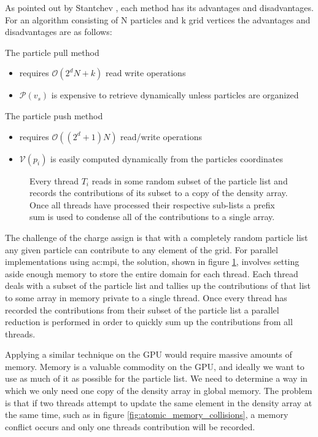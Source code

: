 As pointed out by Stantchev \cite{Stantchev2008}, each method has its advantages and disadvantages. For an algorithm consisting of N particles and k grid vertices the advantages and disadvantages are as follows:

The particle pull method
\begin{itemize}
\item requires $\mathcal{O}(2^dN + k)$ read write operations
\item $\mathcal{P}(v_s)$ is expensive to retrieve dynamically unless particles are organized
\end{itemize}

The particle push method
\begin{itemize}
\item requires $\mathcal{O}((2^d+1)N)$ read/write operations
\item $\mathcal{V}(p_i)$ is easily computed dynamically from the particles coordinates
\end{itemize}


\begin{figure}
\begin{center}

\end{center}
\caption[Charge Assign using MPI]{Every thread $T_i$ reads in some random subset of the particle list and records the contributions of its subset to a copy of the density array. Once all threads have processed their respective sub-lists a prefix sum is used to condense all of the contributions to a single array.}
\label{fig:mpi_chargeassign}
\end{figure}

The challenge of the charge assign is that with a completely random particle list any given particle can contribute to any element of the grid. For parallel implementations using \gls{ac:mpi}, the solution, shown in figure \ref{fig:mpi_chargeassign}, involves setting aside enough memory to store the entire domain for each thread. Each thread deals with a subset of the particle list and tallies up the contributions of that list to some array in memory private to a single thread. Once every thread has recorded the contributions from their subset of the particle list a parallel reduction is performed in order to quickly sum up the contributions from all threads. 


Applying a similar technique on the GPU would require massive amounts of memory. Memory is a valuable commodity on the GPU, and ideally we want to use as much of it as possible for the particle list. We need to determine a way in which we only need one copy of the density array in global memory. The problem is that if two threads attempt to update the same element in the density array at the same time, such as in figure \ref{fig:atomic_memory_collisions}, a memory conflict occurs and only one threads contribution will be recorded. 

